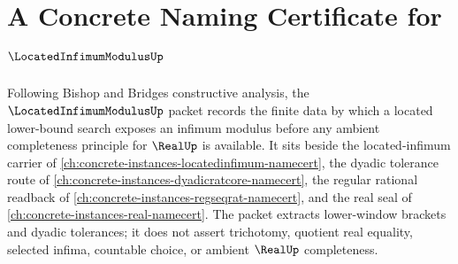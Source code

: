 \chapter{A Concrete Naming Certificate for $\LocatedInfimumModulusUp$}
\label{ch:concrete-instances-located-infimum-modulus-namecert}

Following Bishop and Bridges constructive analysis, the $\LocatedInfimumModulusUp$ packet records the finite data by which a located lower-bound search exposes an infimum modulus before any ambient completeness principle for $\RealUp$ is available. It sits beside the located-infimum carrier of \autoref{ch:concrete-instances-locatedinfimum-namecert}, the dyadic tolerance route of \autoref{ch:concrete-instances-dyadicratcore-namecert}, the regular rational readback of \autoref{ch:concrete-instances-regseqrat-namecert}, and the real seal of \autoref{ch:concrete-instances-real-namecert}. The packet extracts lower-window brackets and dyadic tolerances; it does not assert trichotomy, quotient real equality, selected infima, countable choice, or ambient $\RealUp$ completeness.

